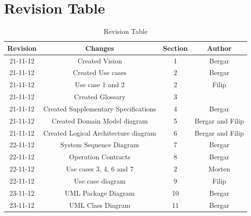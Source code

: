 \documentclass[11pt,a4paper]{article}
\begin{document}
\section{Revision Table}
\begin{table}[h]
\caption{Revision Table}
\begin{center}
\begin{tabular}{c|c|c|c}
\hline 
Revision & Changes & Section & Author \\ \hline 
21-11-12 & Created Vision & 1 & Bergar \\ 
21-11-12 & Created Use cases & 2 & Bergar \\
21-11-12 & Use case 1 and 2 & 2 & Filip \\
21-11-12 & Created Glossary & 3 & \\
21-11-12 & Created Supplementary Specifications & 4 & Bergar \\ 
21-11-12 & Created Domain Model diagram & 5 & Bergar and Filip \\
21-11-12 & Created Logical Architecture diagram & 6 & Bergar and Filip \\
\hline 
22-11-12 & System Sequence Diagram & 7 & Bergar \\
22-11-12 & Operation Contracts & 8 & Bergar \\
22-11-12 & Use cases 3, 4, 6 and 7 & 2 & Morten \\
22-11-12 & Use case diagram & 9 & Filip \\
\hline
23-11-12 & UML Package Diagram & 10 & Bergar \\
23-11-12 & UML Class Diagram & 11 & Bergar \\
\hline
\end{tabular} 
\end{center}
\end{table}
	
\end{document}
